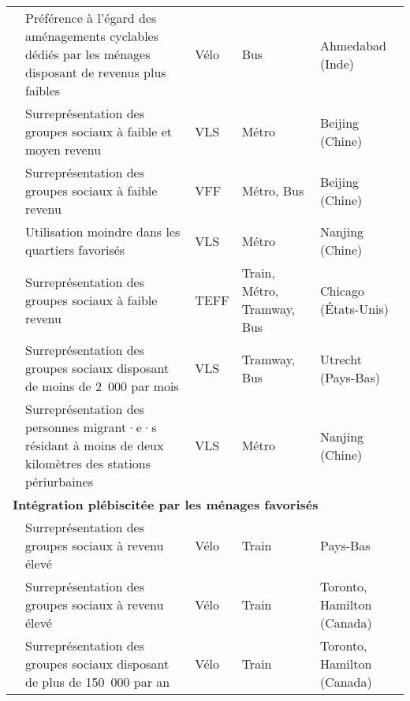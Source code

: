 \begin{longtable}{p{3cm}p{4cm}p{1.5cm}p{1.8cm}p{2.3cm}}
    \small{\textcite{balya_integration_2016}}\index{Balya, Manjurali|pagebf} & \small{Préférence à l'égard des aménagements cyclables dédiés par les ménages disposant de revenus plus faibles} & \small{Vélo} & \small{Bus} & \small{Ahmedabad (Inde)}\\ 
    \small{\textcite{zhao_public_2022}}\index{Zhao, Pengjun|pagebf} & \small{Surreprésentation des groupes sociaux à faible et moyen revenu} & \small{VLS} & \small{Métro} & \small{Beijing (Chine)}\\ 
    \small{\textcite{guo_exploring_2023}}\index{Guo, Dongbo|pagebf} & \small{Surreprésentation des groupes sociaux à faible revenu} & \small{VFF} & \small{Métro, Bus} & \small{Beijing (Chine)}\\
    \small{\textcite{ji_exploring_2018}}\index{Ji, Yanjie|pagebf} & \small{Utilisation moindre dans les quartiers favorisés} & \small{VLS} & \small{Métro} & \small{Nanjing (Chine)}\\ 
    \small{\textcite{mohammadian_analyzing_2022}}\index{Mohammadian, Abolfazl|pagebf} & \small{Surreprésentation des groupes sociaux à faible revenu} & \small{TEFF} & \small{Train, Métro, Tramway, Bus} & \small{Chicago (États-Unis)}\\ 
    \small{\textcite{kuijk_preferences_2022}}\index{van Kuijk, R.J.|pagebf} & \small{Surreprésentation des groupes sociaux disposant de moins de 2~000\€ par mois} & \small{VLS} & \small{Tramway, Bus} & \small{Utrecht (Pays-Bas)}\\
    \small{\textcite{ma_understanding_2018}}\index{Ma, Xinwei|pagebf} & \small{Surreprésentation des personnes migrant·e·s résidant à moins de deux kilomètres des stations périurbaines} & \small{VLS} & \small{Métro} & \small{Nanjing (Chine)}\\
    \hline
\multicolumn{5}{l}{\textbf{Intégration plébiscitée par les ménages favorisés}}\\
    \small{\textcite{shelat_analysing_2018}}\index{Shelat, Sanmay|pagebf} & \small{Surreprésentation des groupes sociaux à revenu élevé} & \small{Vélo} & \small{Train} & \small{Pays-Bas}\\
    \small{\textcite{chan_factors_2020}}\index{Chan, Kevin|pagebf} & \small{Surreprésentation des groupes sociaux à revenu élevé} & \small{Vélo} & \small{Train} & \small{Toronto, Hamilton (Canada)}\\
    \small{\textcite{ravensbergen_biking_2018}}\index{Ravensbergen, Léa|pagebf} & \small{Surreprésentation des groupes sociaux disposant de plus de 150~000\€ par an} & \small{Vélo} & \small{Train} & \small{Toronto, Hamilton (Canada)}\\

\end{longtable}
